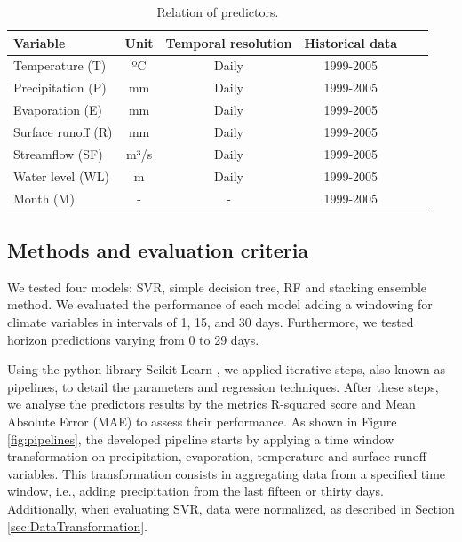 \documentclass[12pt]{article}
\begin{document}
\begin{table}[htbp]
\centering
\caption{Relation of predictors.}
\label{tab:predictors}
    \renewcommand{\arraystretch}{.8}
    \small\begin{tabulary}{\textwidth}{lcCcCr}
        \toprule
            \normalsize\bfseries{Variable} &
            \normalsize\bfseries{Unit} &
            \normalsize\bfseries{Temporal resolution} &
            \normalsize\bfseries{Historical data}  \\
        \midrule
            Temperature (T)    & ºC   & Daily   & 1999-2005 \\
            Precipitation (P)  & mm   & Daily   & 1999-2005 \\
            Evaporation (E)    & mm   & Daily   & 1999-2005 \\
            Surface runoff (R) & mm   & Daily   & 1999-2005 \\
            Streamflow (SF)    & m³/s & Daily   & 1999-2005 \\
            Water level (WL)   & m    & Daily   & 1999-2005 \\
            Month (M)          & -    & -       & 1999-2005 \\
        \bottomrule
    \end{tabulary}
\end{table}


\subsection{Methods and evaluation criteria}

We tested four models: SVR, simple decision tree, RF and stacking ensemble method. We evaluated the performance of each model adding a windowing for climate variables in intervals of 1, 15, and 30 days. Furthermore, we tested horizon predictions varying from 0 to 29 days.

 Using the python library Scikit-Learn \cite{scikit-learn}, we applied iterative steps, also known as pipelines, to detail the parameters and regression techniques. After these steps, we analyse the predictors results by the metrics R-squared score and Mean Absolute Error (MAE) to assess their performance. As shown in Figure \ref{fig:pipelines}, the developed pipeline starts by applying a time window transformation on precipitation, evaporation, temperature and surface runoff variables. This transformation consists in aggregating data from a specified time window, i.e., adding precipitation from the last fifteen or thirty days. Additionally, when evaluating SVR, data were normalized, as described in Section \ref{sec:DataTransformation}.
\end{document}
